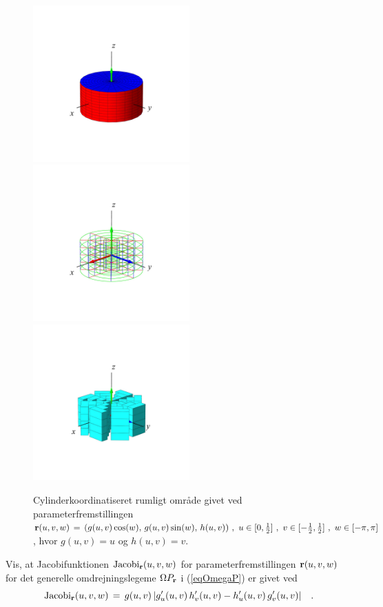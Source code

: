 \begin{figure}[h]
\centerline{\includegraphics[height=60mm]{FIGS/plotCylinder1}\includegraphics[height=60mm]{FIGS/plotCylinder2} \qquad\includegraphics[height=60mm]{FIGS/plotCylinder3}}
\begin{center}
\caption{\small{Cylinderkoordinatiseret rumligt område givet ved
parameterfremstillingen ${\bf r}(u, v, w) \, = \,
(g(u,v)\cos(w), \, g(u,v)\sin(w),\,  h(u,v) )
\,\,, \,\, u \in [0, \frac{1}{2} ]\,\, , \, \, v
\in [-\frac{1}{2}, \frac{1}{2}]\,\, , \, \, w \in
[-\pi, \pi] $, hvor $g(u,v) = u$ og $h(u,v)=v$.}}
\label{figCylinder123}
\end{center}
\end{figure}


\begin{exercise}
Vis, at Jacobifunktionen $\operatorname{Jacobi}_{{\bf r}}(u,v,w)$
for parameterfremstillingen ${\bf r}(u,v,w)$ for
det generelle omdrejningslegeme $\Omega P_{{\bf
r}}$ i (\ref{eqOmegaP}) er givet ved
\begin{equation}
\operatorname{Jacobi}_{{\bf r}}(u,v,w)\, = \, g(u, v)\,|
g'_{u}(u,v)\,h'_{v}(u,v) -
h'_{u}(u,v)\,g'_{v}(u,v)|  \quad .
\end{equation}
\end{exercise}



